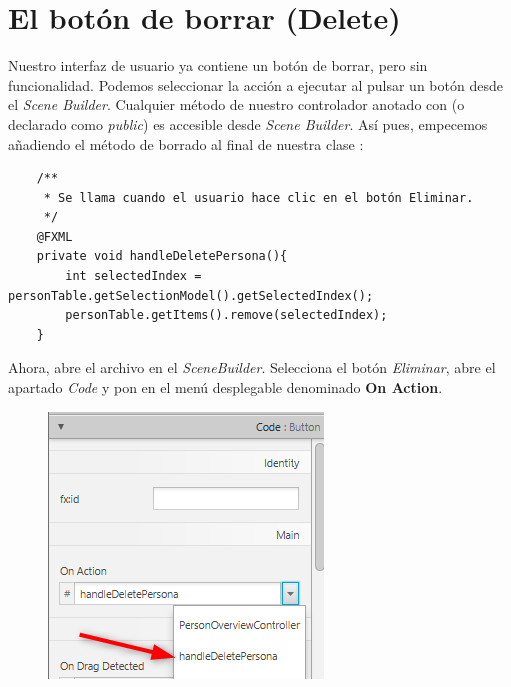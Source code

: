 \section{El botón de borrar (Delete)}
Nuestro interfaz de usuario ya contiene un botón de borrar, pero sin funcionalidad. Podemos seleccionar la 
acción a ejecutar al pulsar un botón desde el \textit{Scene Builder}. Cualquier método de nuestro controlador 
anotado con  (o declarado como \textit{public}) es accesible desde \textit{Scene Builder}. 
Así pues, empecemos añadiendo el método de borrado al final de nuestra clase :\\

\begin{verbatim}
    /**
	 * Se llama cuando el usuario hace clic en el botón Eliminar.
	 */
	@FXML
	private void handleDeletePersona(){
		int selectedIndex = personTable.getSelectionModel().getSelectedIndex();
		personTable.getItems().remove(selectedIndex);
	}
\end{verbatim}

Ahora, abre el archivo  en el \textit{SceneBuilder}. 
Selecciona el botón \textit{Eliminar}, abre el apartado \textit{Code} y pon  
en el menú desplegable denominado \textbf{On Action}.
\begin{figure}[H]
    \includegraphics{img/5-handleDeletePerson.png}
\end{figure}

